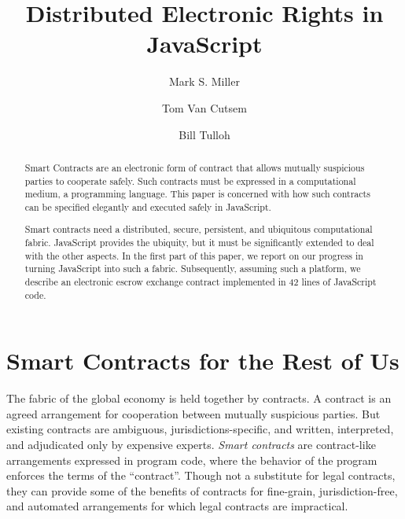\documentclass{llncs}
\begin{document}
\sloppypar


\title{Distributed Electronic Rights in JavaScript}

\author{Mark S. Miller \and Tom Van Cutsem \and Bill Tulloh }


\maketitle    

\begin{abstract}
Smart Contracts are an electronic form of contract that allows mutually suspicious parties to cooperate safely. Such contracts must be expressed in a computational medium, a programming language. This paper is concerned with how such contracts can be specified elegantly and executed safely in JavaScript.

Smart contracts need a distributed, secure, persistent, and ubiquitous computational fabric. JavaScript provides the ubiquity, but it must be significantly extended to deal with the other aspects. In the first part of this paper, we report on our progress in turning JavaScript into such a fabric. Subsequently, assuming such a platform, we describe an electronic escrow exchange contract implemented in 42 lines of JavaScript code.

\end{abstract}


\section{Smart Contracts for the Rest of Us}

The fabric of the global economy is held together by contracts. A contract is an agreed arrangement for cooperation between mutually suspicious parties. But existing contracts are ambiguous, jurisdictions-specific, and written, interpreted, and adjudicated only by expensive experts. \emph{Smart contracts} are contract-like arrangements expressed in program code, where the behavior of the program enforces the terms of the ``contract''\cite{szabo1997formalizing}. Though not a substitute for legal contracts, they can provide some of the benefits of contracts for fine-grain, jurisdiction-free, and automated arrangements for which legal contracts are impractical.
\end{document}

